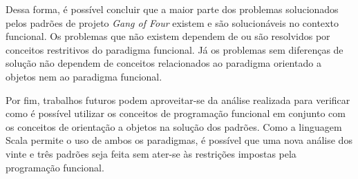 Dessa forma, é possível concluir que a maior 
parte dos problemas solucionados pelos 
padrões de projeto \textit{Gang of Four} 
existem e são solucionáveis no contexto 
funcional. Os problemas que não existem 
dependem de ou são resolvidos por conceitos 
restritivos do paradigma funcional. Já 
os problemas sem diferenças de solução não 
dependem de conceitos relacionados ao 
paradigma orientado a objetos nem ao 
paradigma funcional.


Por fim, trabalhos futuros podem aproveitar-se 
da análise realizada para verificar como 
é possível utilizar os conceitos de 
programação funcional em conjunto com os 
conceitos de orientação a objetos na 
solução dos padrões. Como a linguagem Scala 
permite o uso de ambos os paradigmas, 
é possível que uma nova 
análise dos vinte e três padrões seja feita 
sem ater-se às restrições impostas pela 
programação funcional. 